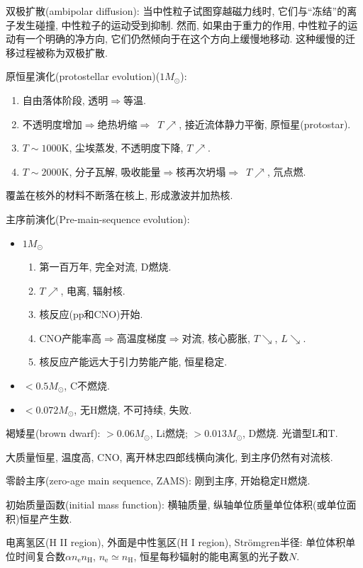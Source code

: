 双极扩散(ambipolar diffusion): 当中性粒子试图穿越磁力线时, 它们与``冻结''的离子发生碰撞, 中性粒子的运动受到抑制. 然而, 如果由于重力的作用, 中性粒子的运动有一个明确的净方向, 它们仍然倾向于在这个方向上缓慢地移动. 这种缓慢的迁移过程被称为双极扩散.

原恒星演化(protostellar evolution)($1M_\odot$): 
\begin{enumerate}
    \item 自由落体阶段, 透明$\Longrightarrow$等温.
    \item 不透明度增加$\Longrightarrow$绝热坍缩$\Longrightarrow$~$T\nearrow$, 接近流体静力平衡, 原恒星(protostar).
    \item $T\sim1000\text{K}$, 尘埃蒸发, 不透明度下降, $T\nearrow$.
    \item $T\sim2000\text{K}$, 分子瓦解, 吸收能量$\Longrightarrow$核再次坍塌$\Longrightarrow$~$T\nearrow$, 氘点燃.
\end{enumerate}
覆盖在核外的材料不断落在核上, 形成激波并加热核.

主序前演化(Pre-main-sequence evolution):
\begin{itemize}
    \item $1M_\odot$\begin{enumerate}
        \item 第一百万年, 完全对流, D燃烧.
        \item $T\nearrow$, 电离, 辐射核.
        \item 核反应(pp和CNO)开始.
        \item CNO产能率高$\Longrightarrow$高温度梯度$\Longrightarrow$对流, 核心膨胀, $T\searrow$, $L\searrow$.
        \item 核反应产能远大于引力势能产能, 恒星稳定.
    \end{enumerate}
    \item $<0.5M_\odot$, C不燃烧.
    \item $<0.072M_\odot$, 无H燃烧, 不可持续, 失败.
\end{itemize}
褐矮星(brown dwarf): $>0.06M_\odot$, Li燃烧; $>0.013M_\odot$, D燃烧. 光谱型L和T.

大质量恒星, 温度高, CNO, 离开林忠四郎线横向演化, 到主序仍然有对流核.

零龄主序(zero-age main sequence, ZAMS): 刚到主序, 开始稳定H燃烧.

初始质量函数(initial mass function): 横轴质量, 纵轴单位质量单位体积(或单位面积)恒星产生数.

电离氢区(H II region), 外面是中性氢区(H I region), Str\"omgren半径: 单位体积单位时间复合数$\alpha n_\text{e}n_\text{H}$, $n_\text{e}\simeq n_\text{H}$, 恒星每秒辐射的能电离氢的光子数$N$.

